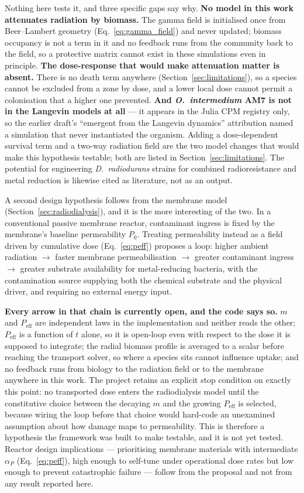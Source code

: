 \documentclass[11pt]{article}
\begin{document}
Nothing here tests it, and three specific gaps say why. \textbf{No model in this work attenuates
radiation by biomass.} The gamma field is initialised once from Beer--Lambert geometry
(Eq.~\ref{eq:gamma_field}) and never updated; biomass occupancy is not a term in it and no feedback
runs from the community back to the field, so a protective matrix cannot exist in these simulations
even in principle. \textbf{The dose-response that would make attenuation matter is absent.} There
is no death term anywhere (Section~\ref{sec:limitations}), so a species cannot be excluded from a
zone by dose, and a lower local dose cannot permit a colonisation that a higher one prevented.
\textbf{And \textit{O.\ intermedium} AM7 is not in the Langevin models at all} --- it appears in
the Julia CPM registry only, so the earlier draft's ``emergent from the Langevin dynamics''
attribution named a simulation that never instantiated the organism. Adding a dose-dependent
survival term and a two-way radiation field are the two model changes that would make this
hypothesis testable; both are listed in Section~\ref{sec:limitations}. The potential for
engineering \textit{D.\ radiodurans} strains for combined radioresistance and metal reduction
\cite{brim2000} is likewise cited as literature, not as an output.

A second design hypothesis follows from the membrane model
(Section~\ref{sec:radiodialysis}), and it is the more interesting of the two. In a conventional
passive membrane reactor, contaminant ingress is fixed by the membrane's baseline permeability
$P_0$. Treating permeability instead as a field driven by cumulative dose
(Eq.~\ref{eq:peff}) proposes a loop: higher ambient radiation $\to$ faster membrane
permeabilisation $\to$ greater contaminant ingress $\to$ greater substrate availability for
metal-reducing bacteria, with the contamination source supplying both the chemical substrate and
the physical driver, and requiring no external energy input.

\textbf{Every arrow in that chain is currently open, and the code says so.}
$m$ and $P_{\mathrm{eff}}$ are independent laws in the implementation and neither reads the other;
$P_{\mathrm{eff}}$ is a function of $t$ alone, so it is open-loop even with respect to the dose it
is supposed to integrate; the radial biomass profile is averaged to a scalar before reaching the
transport solver, so where a species sits cannot influence uptake; and no feedback runs from biology
to the radiation field or to the membrane anywhere in this work. The project retains an explicit
stop condition on exactly this point: no transported dose enters the radiodialysis model until the
constitutive choice between the decaying $m$ and the growing $P_{\mathrm{eff}}$ is selected, because
wiring the loop before that choice would hard-code an unexamined assumption about how damage maps to
permeability. This is therefore a hypothesis the framework was built to make testable, and it is not
yet tested. Reactor design implications --- prioritising membrane materials with intermediate
$\alpha_P$ (Eq.~\ref{eq:peff}), high enough to self-tune under operational dose rates but low
enough to prevent catastrophic failure \cite{fox2009,lara2023} --- follow from the proposal and not
from any result reported here.
\end{document}
